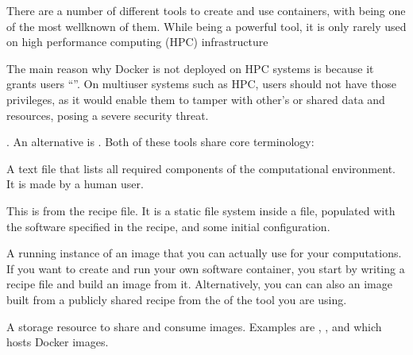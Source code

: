 \sphinxAtStartPar
There are a number of different tools to create and use containers, with
 being one of the most well\sphinxhyphen{}known of them.
While being a powerful tool, it is only rarely used on high performance computing
(HPC) infrastructure%
\begin{footnote}\sphinxAtStartFootnote
The main reason why Docker is not deployed on HPC systems is because
it grants users “”.
On multi\sphinxhyphen{}user systems such as HPC, users should not have those
privileges, as it would enable them to tamper with other’s or shared
data and resources, posing a severe security threat.
%
\end{footnote}. An alternative is .
Both of these tools share core terminology:
\begin{description}
\sphinxAtStartPar
A text file that lists all required components of the computational environment.
It is made by a human user.

\sphinxAtStartPar
This is  from the recipe file. It is a static file system inside a file,
populated with the software specified in the recipe, and some initial configuration.

\sphinxAtStartPar
A running instance of an image that you can actually use for your computations.
If you want to create and run your own software container, you start by writing
a recipe file and build an image from it. Alternatively, you can can also 
an image built from a publicly shared recipe from the  of the tool you are using.

\sphinxAtStartPar
A storage resource to share and consume images. Examples are
{\hyperref[\detokenize{glossary:term-Singularity-Hub}]{}}, {\hyperref[\detokenize{glossary:term-Docker-Hub}]{}}, and  which hosts Docker images.

\end{description}

